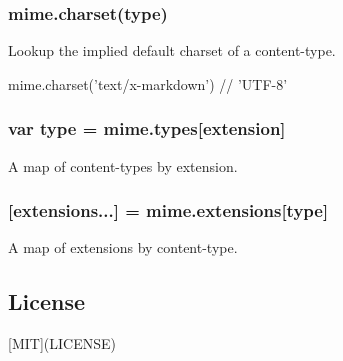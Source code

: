 \subsubsection*{mime.\+charset(type)}

Lookup the implied default charset of a content-\/type.


\begin{DoxyCode}
mime.charset('text/x-markdown') // 'UTF-8'
\end{DoxyCode}


\subsubsection*{var type = mime.\+types\mbox{[}extension\mbox{]}}

A map of content-\/types by extension.

\subsubsection*{\mbox{[}extensions...\mbox{]} = mime.\+extensions\mbox{[}type\mbox{]}}

A map of extensions by content-\/type.

\subsection*{License}

\mbox{[}M\+IT\mbox{]}(L\+I\+C\+E\+N\+SE) 